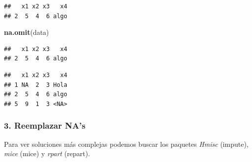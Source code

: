 \documentclass[
]{book}
\newenvironment{Shaded}{\begin{snugshade}}{\end{snugshade}}
\newcommand{\AttributeTok}[1]{\textcolor[rgb]{0.13,0.29,0.53}{#1}}
\newcommand{\CommentTok}[1]{\textcolor[rgb]{0.56,0.35,0.01}{\textit{#1}}}
\newcommand{\ConstantTok}[1]{\textcolor[rgb]{0.56,0.35,0.01}{#1}}
\newcommand{\DecValTok}[1]{\textcolor[rgb]{0.00,0.00,0.81}{#1}}
\newcommand{\FunctionTok}[1]{\textcolor[rgb]{0.13,0.29,0.53}{\textbf{#1}}}
\newcommand{\NormalTok}[1]{#1}
\newcommand{\OtherTok}[1]{\textcolor[rgb]{0.56,0.35,0.01}{#1}}
\newcommand{\SpecialCharTok}[1]{\textcolor[rgb]{0.81,0.36,0.00}{\textbf{#1}}}
\begin{document}
\begin{verbatim}
##   x1 x2 x3   x4
## 2  5  4  6 algo
\end{verbatim}

\begin{Shaded}
\begin{Highlighting}[]
\FunctionTok{na.omit}\NormalTok{(data)}
\end{Highlighting}
\end{Shaded}

\begin{verbatim}
##   x1 x2 x3   x4
## 2  5  4  6 algo
\end{verbatim}

\begin{Shaded}
\end{Shaded}

\begin{verbatim}
##   x1 x2 x3   x4
## 1 NA  2  3 Hola
## 2  5  4  6 algo
## 5  9  1  3 <NA>
\end{verbatim}

\subsubsection{3. Reemplazar NA's}\label{reemplazar-nas}

\begin{Shaded}
\end{Shaded}

Para ver soluciones más complejas podemos buscar los paquetes \emph{Hmisc} (impute), \emph{mice} (mice) y \emph{rpart} (repart).
\end{document}
